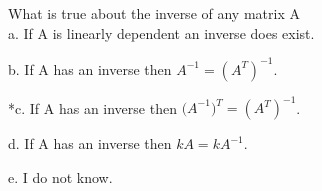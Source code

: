 
What is true about the inverse of any matrix A\\

a. If A is linearly dependent an inverse does exist.

b. If A has an inverse then \( A^{- 1} = (A^{T})^{- 1} \).

*c. If A has an inverse then \( {(A}^{- 1})^{T} = (A^{T})^{- 1} \).

d. If A has an inverse then \( kA = kA^{- 1} \).

e. I do not know.\\
